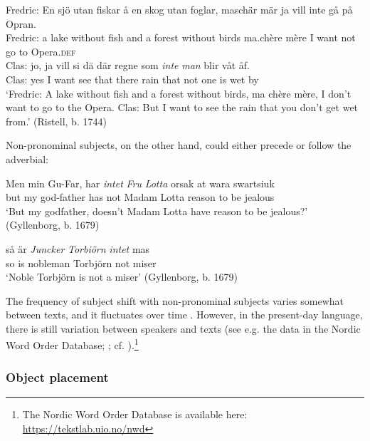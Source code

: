 \documentclass[output=paper]{langscibook}
\begin{document}
\ex\label{ex:intro:14b}
\gll Fredric: En   sjö   utan     fiskar å     en skog     utan     foglar, maschär   mär ja   vill   inte  gå   på Opran.\\
    Fredric:  a     lake   without   fish   and   a   forest   without   birds ma.chère   mère I   want not  go   to Opera\textsc{.def}\\

\gll Clas: jo,   ja   vill   si     dä   där   regne   som \textit{inte} \textit{man} blir   våt   åf. \\
    Clas: yes   I   want   see   that   there   rain     that   not   one   is     wet   by\\

\glt `Fredric: A lake without fish and a forest without birds, ma chère mère, I don’t want to go to the Opera. Clas: But I want to see the rain that you don’t get wet from.’ (Ristell, b. 1744)
\z
\z

Non-pronominal subjects, on the other hand, could either precede or follow the adverbial:


\ea
\ea
\gll  Men   min Gu-Far,       har \textit{intet} \textit{Fru} \textit{Lotta} orsak   at   wara swartsiuk \\
but   my   god-father   has   not   Madam Lotta reason to be   jealous\\

\glt ‘But my godfather, doesn’t Madam Lotta have reason to be jealous?’ (Gyllenborg, b. 1679)

\ex
\gll  så   är \textit{Juncker} \textit{Torbiörn} \textit{intet} mas \\
    so is    nobleman    Torbjörn  not    miser\\
    \glt ‘Noble Torbjörn is not a miser’ (Gyllenborg, b. 1679)
\z
\z


The frequency of subject shift with non-pronominal subjects varies somewhat between texts, and it fluctuates over time \citep{LarssonLundquist2021}. However, in the present-day language, there is still variation between speakers and texts (see e.g. the data in the Nordic Word Order Database; \citealt{LundquistEtAl2019}; cf. \citealt{Andreasson2007}).\footnote{The Nordic Word Order Database is available here: \url{https://tekstlab.uio.no/nwd}} 


\subsubsection{Object placement}\label{sec:intro:3.2.2}
\end{document}
